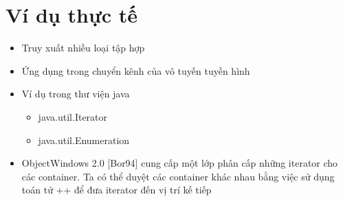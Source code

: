 \newpage
\section{Ví dụ thực tế}
\begin{itemize}
    \item Truy xuất nhiều loại tập hợp
    \item Ứng dụng trong chuyển kênh của vô tuyến tuyền hình
    \item Ví dụ trong thư viện java
    \begin{itemize}
        \item java.util.Iterator 
        \item java.util.Enumeration
    \end{itemize}
    \item ObjectWindows 2.0 [Bor94] cung cấp một lớp phân cấp những iterator cho các container. Ta có thể duyệt các container khác nhau bằng việc sử dụng toán tử ++ để đưa iterator đến vị trí kế tiếp
\end{itemize}


